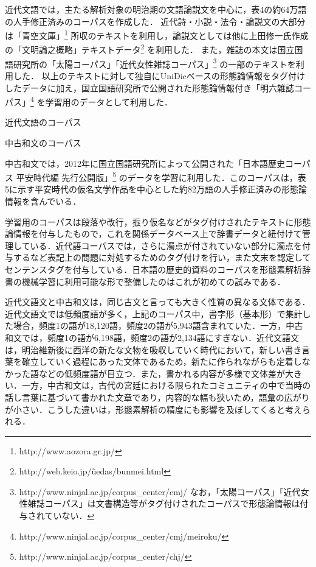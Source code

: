 \documentclass[japanese]{jnlp_1.4}
\begin{document}
近代文語では，主たる解析対象の明治期の文語論説文を中心に，表4の約64万語の人手修正済みのコーパスを作成した．
近代詩・小説・法令・論説文の大部分は「青空文庫」\unskip\footnote{http://www.aozora.gr.jp/} 所収のテキストを利用し，論説文としては他に上田修一氏作成の「文明論之概略」テキストデータ\footnote{http://web.keio.jp/\~uedas/bunmei.html} を利用した．
また，雑誌の本文は国立国語研究所の「太陽コーパス」「近代女性雑誌コーパス」\unskip\footnote{http://www.ninjal.ac.jp/corpus\_center/cmj/ なお，「太陽コーパス」「近代女性雑誌コーパス」は文書構造等がタグ付けされたコーパスで形態論情報は付与されていない．} の一部のテキストを利用した．
以上のテキストに対して独自にUniDicベースの形態論情報をタグ付けしたデータに加え，国立国語研究所で公開された形態論情報付き「明六雑誌コーパス」\unskip\footnote{http://www.ninjal.ac.jp/corpus\_center/cmj/meiroku/} を学習用のデータとして利用した．

\begin{table}[b]
\begin{minipage}[t]{0.5\textwidth}
\caption{近代文語のコーパス}
\label{tab4}

\end{minipage}
\begin{minipage}[t]{0.5\textwidth}
\caption{中古和文のコーパス}
\label{tab5}

\end{minipage}
\end{table}

中古和文では，2012年に国立国語研究所によって公開された「日本語歴史コーパス 平安時代編 先行公開版」\unskip\footnote{http://www.ninjal.ac.jp/corpus\_center/chj/}
のデータを学習に利用した．このコーパスは，表 5に示す平安時代の仮名文学作品を中心とした約82万語の人手修正済みの形態論情報を含んでいる．

学習用のコーパスは段落や改行，振り仮名などがタグ付けされたテキストに形態論情報を付与したもので，これを関係データベース上で辞書データと紐付けて管理している．近代語コーパスでは，さらに濁点が付されていない部分に濁点を付与するなど表記上の問題に対処するためのタグ付けを行い，また文末を認定してセンテンスタグを付与している．日本語の歴史的資料のコーパスを形態素解析辞書の機械学習に利用可能な形で整備したのはこれが初めての試みである．

近代文語文と中古和文は，同じ古文と言っても大きく性質の異なる文体である．近代文語文では低頻度語が多く，上記のコーパス中，書字形（基本形）で集計した場合，頻度1の語が18,120語，頻度2の語が5,943語含まれていた．一方，中古和文では，頻度1の語が6,198語，頻度2の語が2,134語にすぎない．近代文語文は，明治維新後に西洋の新たな文物を吸収していく時代において，新しい書き言葉を確立していく過程にあった文体であるため，新たに作られながらも定着しなかった語などの低頻度語が目立つ．また，書かれる内容が多様で文体差が大きい．一方，中古和文は，古代の宮廷における限られたコミュニティの中で当時の話し言葉に基づいて書かれた文章であり，内容的な幅も狭いため，語彙の広がりが小さい．こうした違いは，形態素解析の精度にも影響を及ぼしてくると考えられる．
\end{document}
